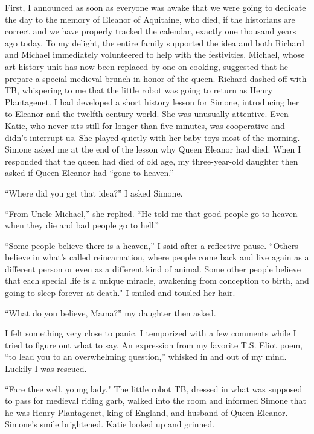 \documentclass[]{article}
\begin{document}
First, I announced as soon as everyone was awake that we were going to dedicate the day to the memory of Eleanor of Aquitaine, who died, if the historians are correct and we have properly tracked the calendar, exactly one thousand years ago today.  To my delight, the entire family supported the idea and both Richard and Michael immediately volunteered to help with the festivities.  Michael, whose art history unit has now been replaced by one on cooking, suggested that he prepare a special medieval brunch in honor of the queen.  Richard dashed off with TB, whispering to me that the little robot was going to return as Henry Plantagenet.  I had developed a short history lesson for Simone, introducing her to Eleanor and the twelfth century world.  She was unusually attentive.  Even Katie, who never sits still for longer than five minutes, was cooperative and didn’t interrupt us.  She played quietly with her baby toys most of the morning.  Simone asked me at the end of the lesson why Queen Eleanor had died.  When I responded that the queen had died of old age, my three-year-old daughter then asked if Queen Eleanor had “gone to heaven.”

“Where did you get that idea?” I asked Simone.

“From Uncle Michael,” she replied.  “He told me that good people go to heaven when they die and bad people go to hell.”

“Some people believe there is a heaven,” I said after a reflective pause.  “Others believe in what’s called reincarnation, where people come back and live again as a different person or even as a different kind of animal.  Some other people believe that each special life is a unique miracle, awakening from conception to birth, and going to sleep forever at death."  I smiled and tousled her hair.

“What do you believe, Mama?” my daughter then asked.

I felt something very close to panic.  I temporized with a few comments while I tried to figure out what to say.  An expression from my favorite T.S.  Eliot poem, “to lead you to an overwhelming question,” whisked in and out of my mind.  Luckily I was rescued.

“Fare thee well, young lady."  The little robot TB, dressed in what was supposed to pass for medieval riding garb, walked into the room and informed Simone that he was Henry Plantagenet, king of England, and husband of Queen Eleanor.  Simone’s smile brightened.  Katie looked up and grinned.
\end{document}

